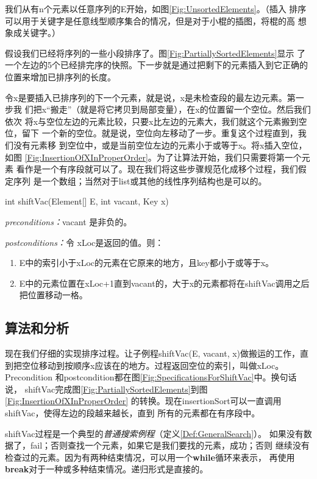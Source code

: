 我们从有n个元素以任意序列的E开始，如图\ref{Fig:UnsortedElements}。（插入
排序可以用于关键字是任意线型顺序集合的情况，但是对于小棍的插图，将棍的高
想象成关键字。）

假设我们已经将序列的一些小段排序了。图\ref{Fig:PartiallySortedElements}显示
了一个左边的5个已经排完序的快照。下一步就是通过把剩下的元素插入到它正确的
位置来增加已排序列的长度。

令x是要插入已排序列的下一个元素，就是说，x是未检查段的最左边元素。第一步我
们把x“搬走”（就是将它拷贝到局部变量），在x的位置留一个空位。然后我们依次
将x与空位左边的元素比较，只要x比左边的元素大，我们就这个元素搬到空位，留下
一个新的空位。就是说，空位向左移动了一步。重复这个过程直到，我们没有元素移
到空位中，或是当前空位左边的元素小于或等于x。将x插入空位，如图
\ref{Fig:InsertionOfXInProperOrder}。为了让算法开始，我们只需要将第一个元素
看作是一个有序段就可以了。现在我们将这些步骤规范化成移个过程，我们假定序列
是一个数组；当然对于list或其他的线性序列结构也是可以的。

\begin{figure*}[!t]
\colorbox[rgb]{0.9, 0.9, 0.9}{int shiftVac(Element[] E, int vacant, Key x)}

\emph{preconditions：}vacant 是非负的。

\emph{postconditions：}令 xLoc是返回的值。则：
\begin{enumerate}
\item E中的索引小于xLoc的元素在它原来的地方，且key都小于或等于x。
\item E中的元素位置在xLoc+1直到vacant的，大于x的元素都将在shiftVac调用之后把位置移动一格。
\end{enumerate}
\caption{shiftVac的规范}
\label{Fig:SpecificationsForShiftVac}
\end{figure*}

\subsection{算法和分析}
现在我们仔细的实现排序过程。让子例程shiftVac(E, vacant, x)做搬运的工作，直
到把空位移动到按顺序x应该在的地方。过程返回空位的索引，叫做xLoc。Precondition
和postcondition都在图\ref{Fig:SpecificationsForShiftVac}中。换句话说，
shiftVac完成图\ref{Fig:PartiallySortedElements}到图\ref{Fig:InsertionOfXInProperOrder}
的转换。现在insertionSort可以一直调用shiftVac，使得左边的段越来越长，直到
所有的元素都在有序段中。

shiftVac过程是一个典型的\emph{普通搜索例程}（定义\ref{Def:GeneralSearch}）。
如果没有数据了，fail；否则查找一个元素，如果它是我们要找的元素，成功；否则
继续没有检查过的元素。因为有两种结束情况，可以用一个\textbf{while}循环来表示，
再使用\textbf{break}对于一种或多种结束情况。递归形式是直接的。

